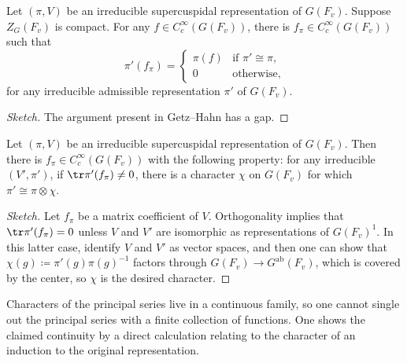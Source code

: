 \documentclass{article}
\begin{document}
\begin{proposition}
	Let $(\pi,V)$ be an irreducible supercuspidal representation of $G(F_v)$. Suppose $Z_G(F_v)$ is compact. For any $f\in C_c^\infty(G(F_v))$, there is $f_\pi\in C_c^\infty(G(F_v))$ such that
	\[\pi'(f_\pi)=\begin{cases}
		\pi(f) & \text{if }\pi'\cong\pi, \\
		0 & \text{otherwise},
	\end{cases}\]
	for any irreducible admissible representation $\pi'$ of $G(F_v)$.
\end{proposition}
\begin{proof}[Sketch]
	The argument present in Getz--Hahn has a gap.
\end{proof}
\begin{proposition}
	Let $(\pi,V)$ be an irreducible supercuspidal representation of $G(F_v)$. Then there is $f_\pi\in C_c^\infty(G(F_v))$ with the following property: for any irreducible $(V',\pi')$, if $\tr\pi'(f_\pi)\ne0$, there is a character $\chi$ on $G(F_v)$ for which $\pi'\cong\pi\otimes\chi$.
\end{proposition}
\begin{proof}[Sketch]
	Let $f_\pi$ be a matrix coefficient of $V$. Orthogonality implies that $\tr\pi'(f_\pi)=0$ unless $V$ and $V'$ are isomorphic as representations of $G(F_v)^1$. In this latter case, identify $V$ and $V'$ as vector spaces, and then one can show that $\chi(g)\coloneqq\pi'(g)\pi(g)^{-1}$ factors through $G(F_v)\to G^{\mathrm{ab}}(F_v)$, which is covered by the center, so $\chi$ is the desired character.
\end{proof}
\begin{remark}
	Characters of the principal series live in a continuous family, so one cannot single out the principal series with a finite collection of functions. One shows the claimed continuity by a direct calculation relating to the character of an induction to the original representation.\todo{}
\end{remark}
\end{document}

